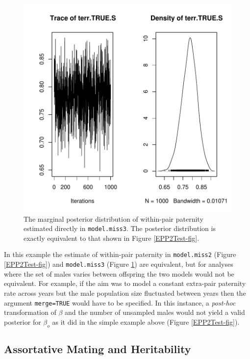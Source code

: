 \documentclass{article}
\begin{document}
\begin{figure}[!h]
\begin{center}
\includegraphics{Tutorial-084}
\end{center}
\caption{The marginal posterior distribution of within-pair paternity estimated directly in \texttt{model.miss3}. The posterior distribution is exactly equivalent to that shown in Figure \ref{EPP2Test-fig}.}
\label{EPPmerge-fig}
\end{figure}


In this example the estimate of within-pair paternity in \texttt{model.miss2} (Figure \ref{EPP2Test-fig}) and \texttt{model.miss3} (Figure \ref{EPPmerge-fig}) are equivalent, but for analyses where the set of males varies between offspring the two models would not be equivalent.  For example, if the aim was to model a constant extra-pair paternity rate across years but the male population size fluctuated between years then the argument \texttt{merge=TRUE} would have to be specified.  In this instance, a \emph{post-hoc} transformation of $\beta$ and the number of unsampled males would not yield a valid posterior for $\beta_{o}$ as it did in the simple example above (Figure \ref{EPP2Test-fig}).   

\subsection{Assortative Mating and Heritability}
\end{document}
